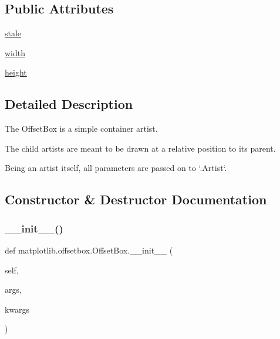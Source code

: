 \subsection*{Public Attributes}
\begin{DoxyCompactItemize}
\item 
\hyperlink{classmatplotlib_1_1offsetbox_1_1OffsetBox_a63847e022c497e23929d1097217cb502}{stale}
\item 
\hyperlink{classmatplotlib_1_1offsetbox_1_1OffsetBox_abac1dd3129951024dc82dd89aaa73c71}{width}
\item 
\hyperlink{classmatplotlib_1_1offsetbox_1_1OffsetBox_a1e3aa392cb62c6c31bd004c42b1f1553}{height}
\end{DoxyCompactItemize}


\subsection{Detailed Description}
\begin{DoxyVerb}The OffsetBox is a simple container artist.

The child artists are meant to be drawn at a relative position to its
parent.

Being an artist itself, all parameters are passed on to `.Artist`.
\end{DoxyVerb}
 

\subsection{Constructor \& Destructor Documentation}
\mbox{\label{classmatplotlib_1_1offsetbox_1_1OffsetBox_a861c42317b3c5d68002e4da354bb5330}} 
\subsubsection{\texorpdfstring{\+\_\+\+\_\+init\+\_\+\+\_\+()}{\_\_init\_\_()}}
{\footnotesize\ttfamily def matplotlib.\+offsetbox.\+Offset\+Box.\+\_\+\+\_\+init\+\_\+\+\_\+ (\begin{DoxyParamCaption}\item[{}]{self,  }\item[{}]{args,  }\item[{}]{kwargs }\end{DoxyParamCaption})}



